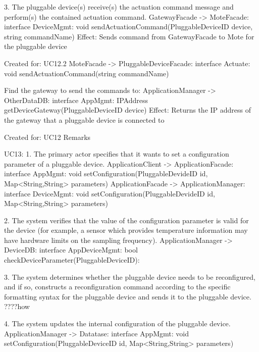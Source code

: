             3. The pluggable device(s) receive(s) the actuation command message and perform(s) the contained actuation command.
                    GatewayFacade -> MoteFacade:         interface DeviceMgmt: void sendActuationCommand(PluggableDeviceID device, string commandName)
                    Effect: Sends command from GatewayFacade to Mote for the pluggable device
                        \item Created for: UC12.2
                    MoteFacade -> PluggableDeviceFacade: interface Actuate:    void sendActuationCommand(string commandName)


            Find the gateway to send the commands  to:
                ApplicationManager -> OtherDataDB: interface AppMgmt: IPAddress getDeviceGateway(PluggableDeviceID device)
                    Effect: Returns the IP address of the gateway that a pluggable device is connected to
                    \item Created for: UC12 Remarks


        UC13:
            1. The primary actor specifies that it wants to set a configuration parameter of a pluggable
            device.
                ApplicationClient -> ApplicationFacade: interface AppMgmt:
                                                        void setConfiguration(PluggableDevideID id, Map<String,String> parameters)
                ApplicationFacade -> ApplicationManager: interface DeviceMgmt:
                                                        void setConfiguration(PluggableDevideID id, Map<String,String> parameters)


            2. The system verifies that the value of the configuration parameter is valid for the device (for
               example, a sensor which provides temperature information may have hardware limits on the
               sampling frequency).
               ApplicationManager -> DeviceDB: interface AppDeviceMgmt: bool checkDeviceParameter(PluggableDeviceID):

            3. The system determines whether the pluggable device needs to be reconfigured, and if so,
               constructs a reconfiguration command according to the specific formatting syntax for the
               pluggable device and sends it to the pluggable device. ????how

            4. The system updates the internal configuration of the pluggable device.
                ApplicationManager -> Datatase: interface AppMgmt:
                                                     void setConfiguration(PluggableDeviceID id, Map<String,String> parameters)

